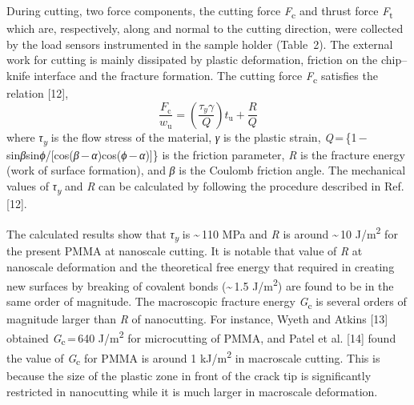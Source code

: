 \documentclass{article}
\begin{document}
During cutting, two force components, the cutting force \emph{F}\textsubscript{c} and thrust force \emph{F}\textsubscript{t} which are, respectively, along and normal to the cutting direction, were collected by the load sensors instrumented in the sample holder (Table~2). The external work for cutting is mainly dissipated by plastic deformation, friction on the chip–knife interface and the fracture formation. The cutting force \emph{F}\textsubscript{c} satisfies the relation [12],
\begin{equation*}
\frac{F_\mathrm{c}}{w_\mathrm{u}} = \left(\frac{\tau_y\gamma}{Q}\right)t_\mathrm{u} + \frac{R}{Q} \tag{3}
\end{equation*}
where \emph{τ}\textsubscript{\emph{y}} is the flow stress of the material, \emph{γ} is the plastic strain, \emph{Q}\,=\,\{1\,−\,sin\emph{β}sin\emph{ϕ}/[cos(\emph{β}\,−\,\emph{α})cos(\emph{ϕ}\,−\,\emph{α})]\} is the friction parameter, \emph{R} is the fracture energy (work of surface formation), and \emph{β} is the Coulomb friction angle. The mechanical values of \emph{τ}\textsubscript{\emph{y}} and \emph{R} can be calculated by following the procedure described in Ref. [12].

The calculated results show that \emph{τ}\textsubscript{\emph{y}} is \textasciitilde\,110 MPa and \emph{R} is around \textasciitilde\,10 J/m\textsuperscript{2} for the present PMMA at nanoscale cutting. It is notable that value of \emph{R} at nanoscale deformation and the theoretical free energy that required in creating new surfaces by breaking of covalent bonds (\textasciitilde\,1.5 J/m\textsuperscript{2}) are found to be in the same order of magnitude. The macroscopic fracture energy \emph{G}\textsubscript{c} is several orders of magnitude larger than \emph{R} of nanocutting. For instance, Wyeth and Atkins [13] obtained \emph{G}\textsubscript{c}\,=\,640 J/m\textsuperscript{2} for microcutting of PMMA, and Patel et al. [14] found the value of \emph{G}\textsubscript{c} for PMMA is around 1 kJ/m\textsuperscript{2} in macroscale cutting. This is because the size of the plastic zone in front of the crack tip is significantly restricted in nanocutting while it is much larger in macroscale deformation.
\end{document}
